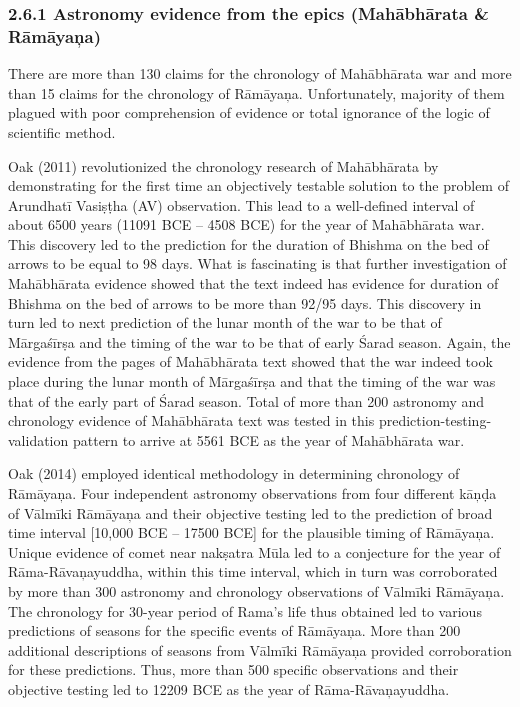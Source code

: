 \subsubsection*{2.6.1 Astronomy evidence from the epics (Mahābhārata \& Rāmāyaņa)}

There are more than 130 claims for the chronology of Mahābhārata war and more than 15 claims for the chronology of Rāmāyaņa. Unfortunately, majority of them plagued with poor comprehension of evidence or total ignorance of the logic of scientific method.

Oak (2011) revolutionized the chronology research of Mahābhārata by demonstrating for the first time an objectively testable solution to the problem of Arundhatī Vasiṣṭha (AV) observation. This lead to a well-defined interval of about 6500 years (11091 BCE – 4508 BCE) for the year of Mahābhārata war. This discovery led to the prediction for the duration of Bhishma on the bed of arrows to be equal to 98 days. What is fascinating is that further investigation of Mahābhārata evidence showed that the text indeed has evidence for duration of Bhishma on the bed of arrows to be more than 92/95 days. This discovery in turn led to next prediction of the lunar month of the war to be that of Mārgaśīrṣa and the timing of the war to be that of early Śarad season. Again, the evidence from the pages of Mahābhārata text showed that the war indeed took place during the lunar month of Mārgaśīrṣa and that the timing of the war was that of the early part of Śarad season. Total of more than 200 astronomy and chronology evidence of Mahābhārata text was tested in this prediction-testing-validation pattern to arrive at 5561 BCE as the year of Mahābhārata war.

Oak (2014) employed identical methodology in determining chronology of Rāmāyaņa. Four independent astronomy observations from four different kāņḍa of Vālmīki Rāmāyaņa and their objective testing led to the prediction of broad time interval [10,000 BCE – 17500 BCE] for the plausible timing of Rāmāyaņa. Unique evidence of comet near nakṣatra Mūla led to a conjecture for the year of Rāma-Rāvaņayuddha, within this time interval, which in turn was corroborated by more than 300 astronomy and chronology observations of Vālmīki Rāmāyaņa. The chronology for 30-year period of Rama’s life thus obtained led to various predictions of seasons for the specific events of Rāmāyaņa. More than 200 additional descriptions of seasons from Vālmīki Rāmāyaņa provided corroboration for these predictions. Thus, more than 500 specific observations and their objective testing led to 12209 BCE as the year of Rāma-Rāvaņayuddha.

